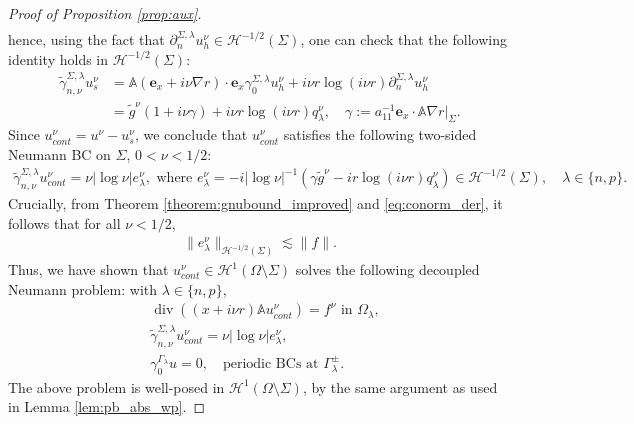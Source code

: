 \documentclass[report]{elsarticle}
\numberwithin{theorem}{section}
\renewcommand{\vec}[1]{\mathbf{#1}}
\begin{document}
\begin{proof}[Proof of Proposition \ref{prop:aux}]
\begin{align*}
	\end{align*}
	hence, using the fact that $\partial_{n}^{\Sigma,\lambda}u^{\nu}_h\in \mathcal{H}^{-1/2}(\Sigma)$, one can check that the following identity holds in  $\mathcal{H}^{-1/2}(\Sigma)$:
	\begin{align*}
		\widetilde{\gamma}_{n,\nu}^{\Sigma,\lambda}u^{\nu}_{s}&=\mathbb{A}(\vec{e}_x+i\nu \nabla r)\cdot \vec{e}_x\gamma_0^{\Sigma,\lambda}u^{\nu}_{h}+i\nu r\log(i\nu r)\partial_n^{\Sigma,\lambda}u^{\nu}_h  \\
		&=\widetilde{g}^{\nu}(1+i\nu \gamma)+i\nu r\log(i\nu r)q^{\nu}_{\lambda}, \quad \gamma:=a_{11}^{-1}\left.\vec{e}_x\cdot\mathbb{A}\nabla r\right|_{\Sigma}.
	\end{align*}
	Since $u^{\nu}_{cont}=u^{\nu}-u^{\nu}_{s}$, we  conclude that $u^{\nu}_{cont}$ satisfies the following two-sided Neumann BC on $\Sigma$, $0<\nu<1/2$:
	\begin{align}
		\label{eq:two_sided_neumann}
		\tilde{\gamma}_{n,\nu}^{\Sigma,\lambda}u^{\nu}_{cont}=\nu |\log\nu| e^{\nu}_{\lambda}, \text{ where } e^{\nu}_{\lambda}=-i|\log\nu|^{-1} \left(\gamma \widetilde{g}^{\nu}-i r\log(i\nu r)q^{\nu}_{\lambda}\right)\in \mathcal{H}^{-1/2}(\Sigma), \quad \lambda\in \{n,p\}.
	\end{align}
	Crucially, from Theorem \ref{theorem:gnubound_improved} and \eqref{eq:conorm_der}, it follows that for all $\nu<1/2$,  
	\begin{align}
		\label{eq:enu}
		\|e^{\nu}_{\lambda}\|_{\mathcal{H}^{-1/2}(\Sigma)}\lesssim \|f\|.
	\end{align}
	Thus, we have shown that $u^{\nu}_{cont}\in \mathcal{H}^1(\Omega\setminus\Sigma)$ solves the following decoupled Neumann problem: with $\lambda\in \{n,p\}$, 
	\begin{align*}
		&\operatorname{div}((x+i\nu r)\mathbb{A}u^{\nu}_{cont})=f^{\nu} \text{ in }\Omega_{\lambda},\\
		&\tilde{\gamma}_{n,\nu}^{\Sigma,\lambda}u^{\nu}_{cont}=\nu |\log\nu| e^{\nu}_{\lambda}, \\ &\gamma_0^{\Gamma_{\lambda}}u=0, \quad\text{periodic BCs at }\Gamma^{\pm}_{\lambda}. 
	\end{align*}
	The above problem is well-posed in $\mathcal{H}^1(\Omega\setminus\Sigma)$, by the same argument as used in Lemma \ref{lem:pb_abs_wp}. 
	

\end{proof}
\end{document}

